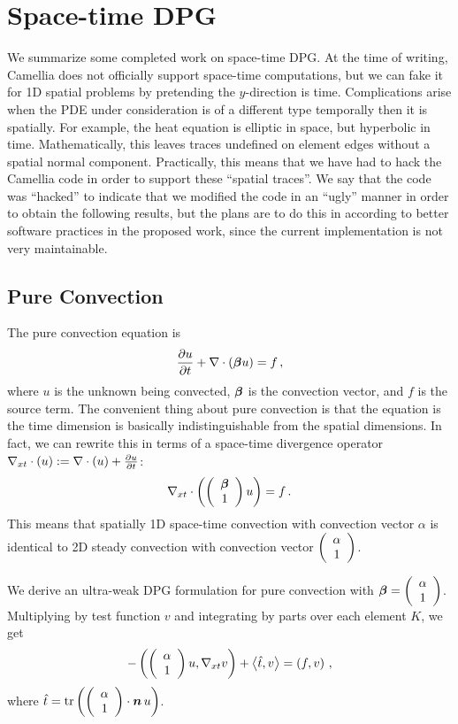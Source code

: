 \documentclass[Proposal.tex]{subfiles}
\begin{document}
\chapter{Space-time DPG}
We summarize some completed work on space-time DPG. At the time of writing, Camellia does not officially support space-time computations, but we can fake it for 1D spatial problems by pretending the $y$-direction is time.
Complications arise when the PDE under consideration is of a different type temporally then it is spatially. 
For example, the heat equation is elliptic in space, but hyperbolic in time. 
Mathematically, this leaves traces undefined on element edges without a spatial normal component. 
Practically, this means that we have had to hack the Camellia code in order to support these ``spatial traces''.
We say that the code was ``hacked'' to indicate that we modified the code in an ``ugly'' manner in order to obtain the following results, 
but the plans are to do this in according to better software practices in the proposed work, since the current implementation is not very maintainable.

\section{Pure Convection}
The pure convection equation is 
\begin{equation}
\frac{\partial u}{\partial t}+\nabla\cdot(\boldsymbol\beta u)=f\,,
\end{equation}
where $u$ is the unknown being convected, $\boldsymbol\beta$ is the convection vector, and $f$ is the source term.
The convenient thing about pure convection is that the equation is the time dimension is basically indistinguishable from the spatial dimensions. 
In fact, we can rewrite this in terms of a space-time divergence operator $\nabla_{xt}\cdot(u):=\nabla\cdot(u)+\frac{\partial u}{\partial t}$:
\[
\nabla_{xt}\cdot\left( \left( \begin{array}{c} \boldsymbol\beta\\ 1\\ \end{array} \right)u \right)=f\,.
\]
This means that spatially 1D space-time convection with convection vector $\alpha$ is identical to 2D steady convection with convection vector $\left( \begin{array}{c} \alpha\\ 1\\ \end{array} \right)$.

We derive an ultra-weak DPG formulation for pure convection with $\boldsymbol\beta=\left( \begin{array}{c} \alpha\\ 1\\ \end{array} \right)$. 
Multiplying by test function $v$ and integrating by parts over each element $K$, we get
\begin{equation}
-\left( \left( \begin{array}{c} \alpha\\ 1\\ \end{array} \right)u,\nabla_{xt} v \right)+\left\langle \hat t, v \right\rangle=\left( f,v \right)\,,
\end{equation}
where $\hat t=\operatorname*{tr}\left( \left( \begin{array}{c} \alpha\\ 1\\ \end{array} \right)\cdot\boldsymbol n\,u \right)$.
\end{document}
